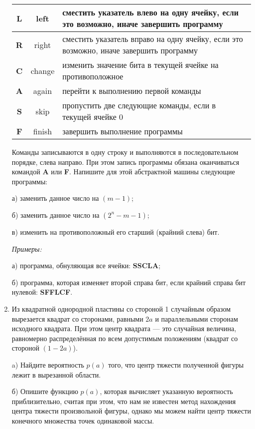 \begin{enumerate}
\begin{tabular}{|c|c|p{7.7cm}|}
\hline
{\bf L} & left & сместить указатель влево на одну ячейку, если это возможно, иначе завершить программу\\
\hline
{\bf R} & right & сместить указатель вправо на одну ячейку, если это возможно, иначе завершить программу\\
\hline
{\bf C} & change & изменить значение бита в текущей ячейке на противоположное\\
\hline
{\bf A} & again & перейти к выполнению первой команды\\
\hline
{\bf S} & skip & пропустить две следующие команды, если в текущей ячейке 0\\
\hline
{\bf F} & finish & завершить выполнение программы\\
\hline
\end{tabular}

Команды записываются в одну строку и выполняются в последовательном порядке, слева направо. При этом запись программы обязана оканчиваться командой \textbf{A} или \textbf{F}. Напишите для этой абстрактной машины следующие программы:

а) заменить данное число на $(m - 1)$;

б) заменить данное число на $(2^n - m - 1)$;

в) изменить на противоположный его старший (крайний слева) бит.

\textit{Примеры:}

а) программа, обнуляющая все ячейки: \textbf{SSCLA};

б) программа, которая изменяет второй справа бит, если крайний справа бит нулевой: \textbf{SFFLCF}.


\item Из квадратной однородной пластины со стороной 1 случайным образом вырезается квадрат со сторонами, равными $2a$ и параллельными сторонам исходного квадрата. При этом центр квадрата --- это случайная величина, равномерно распределённая по всем допустимым положениям (квадрат со стороной $(1 - 2a)$).

a) Найдите вероятность $p(a)$ того, что центр тяжести полученной фигуры лежит в вырезанной области.

б) Опишите функцию $p(a)$, которая вычисляет указанную вероятность приблизительно, считая при этом, что нам не известен метод нахождения центра тяжести произвольной фигуры, однако мы можем найти центр тяжести конечного множества точек одинаковой массы.

\end{enumerate}
